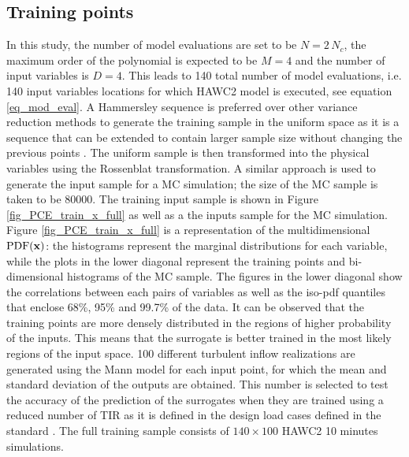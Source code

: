 \documentclass[preprint,12pt]{elsarticle}
\begin{document}
\subsection{Training points}

In this study, the number of model evaluations are set to be $N=2\,N_c$, the maximum order of the polynomial is expected to be $M=4$ and the number of input variables is $D=4$. This leads to 140 total number of model evaluations, i.e. 140 input variables locations for which HAWC2 model is executed, see equation \ref{eq_mod_eval}. %
A Hammersley sequence \cite{hammersley1960monte} is preferred over other variance reduction methods to generate the training sample in the uniform space as it is a sequence that can be extended to contain larger sample size without changing the previous points \cite{feinberg2015chaospy,hosder2007efficient}. The uniform sample is then transformed into the physical variables using the Rossenblat transformation. A similar approach is used to generate the input sample for a MC simulation; the size of the MC sample is taken to be 80000. The training input sample is shown in Figure \ref{fig_PCE_train_x_full} as well as a the inputs sample for the MC simulation. Figure \ref{fig_PCE_train_x_full} is a representation of the multidimensional $\mathrm{PDF}(\mathbf{x})$: the histograms represent the marginal distributions for each variable, while the plots in the lower diagonal represent the training points and bi-dimensional histograms of the MC sample. The figures in the lower diagonal show the correlations between each pairs of variables as well as the iso-pdf quantiles that enclose 68\%, 95\% and 99.7\% of the data. It can be observed that the training points are more densely distributed in the regions of higher probability of the inputs. This means that the surrogate is better trained in the most likely regions of the input space.  100 different turbulent inflow realizations are generated using the Mann model for each input point, for which the mean and standard deviation of the outputs are obtained. This number is selected to test the accuracy of the prediction of the surrogates when they are trained using a reduced number of TIR as it is defined in the design load cases defined in the standard \cite{international2005iec}. The full training sample consists of $140 \times 100$ HAWC2 10 minutes simulations.
\end{document}
